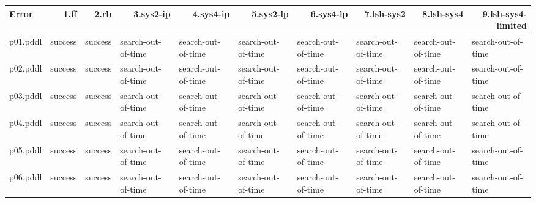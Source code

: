 \documentclass{article}
\begin{document}
\begin{tabular}{@{}lrrrrrrrrr@{}}
Error & 1.ff & 2.rb & 3.sys2-ip & 4.sys4-ip & 5.sys2-lp & 6.sys4-lp & 7.lsh-sys2 & 8.lsh-sys4 & 9.lsh-sys4-limited \\
\midrule
p01.pddl & \multicolumn{1}{|l|}{success} & \multicolumn{1}{|l|}{success} & \multicolumn{1}{|l|}{search-out-of-time} & \multicolumn{1}{|l|}{search-out-of-time} & \multicolumn{1}{|l|}{search-out-of-time} & \multicolumn{1}{|l|}{search-out-of-time} & \multicolumn{1}{|l|}{search-out-of-time} & \multicolumn{1}{|l|}{search-out-of-time} & \multicolumn{1}{|l|}{search-out-of-time} \\
p02.pddl & \multicolumn{1}{|l|}{success} & \multicolumn{1}{|l|}{success} & \multicolumn{1}{|l|}{search-out-of-time} & \multicolumn{1}{|l|}{search-out-of-time} & \multicolumn{1}{|l|}{search-out-of-time} & \multicolumn{1}{|l|}{search-out-of-time} & \multicolumn{1}{|l|}{search-out-of-time} & \multicolumn{1}{|l|}{search-out-of-time} & \multicolumn{1}{|l|}{search-out-of-time} \\
p03.pddl & \multicolumn{1}{|l|}{success} & \multicolumn{1}{|l|}{success} & \multicolumn{1}{|l|}{search-out-of-time} & \multicolumn{1}{|l|}{search-out-of-time} & \multicolumn{1}{|l|}{search-out-of-time} & \multicolumn{1}{|l|}{search-out-of-time} & \multicolumn{1}{|l|}{search-out-of-time} & \multicolumn{1}{|l|}{search-out-of-time} & \multicolumn{1}{|l|}{search-out-of-time} \\
p04.pddl & \multicolumn{1}{|l|}{success} & \multicolumn{1}{|l|}{success} & \multicolumn{1}{|l|}{search-out-of-time} & \multicolumn{1}{|l|}{search-out-of-time} & \multicolumn{1}{|l|}{search-out-of-time} & \multicolumn{1}{|l|}{search-out-of-time} & \multicolumn{1}{|l|}{search-out-of-time} & \multicolumn{1}{|l|}{search-out-of-time} & \multicolumn{1}{|l|}{search-out-of-time} \\
p05.pddl & \multicolumn{1}{|l|}{success} & \multicolumn{1}{|l|}{success} & \multicolumn{1}{|l|}{search-out-of-time} & \multicolumn{1}{|l|}{search-out-of-time} & \multicolumn{1}{|l|}{search-out-of-time} & \multicolumn{1}{|l|}{search-out-of-time} & \multicolumn{1}{|l|}{search-out-of-time} & \multicolumn{1}{|l|}{search-out-of-time} & \multicolumn{1}{|l|}{search-out-of-time} \\
p06.pddl & \multicolumn{1}{|l|}{success} & \multicolumn{1}{|l|}{success} & \multicolumn{1}{|l|}{search-out-of-time} & \multicolumn{1}{|l|}{search-out-of-time} & \multicolumn{1}{|l|}{search-out-of-time} & \multicolumn{1}{|l|}{search-out-of-time} & \multicolumn{1}{|l|}{search-out-of-time} & \multicolumn{1}{|l|}{search-out-of-time} & \multicolumn{1}{|l|}{search-out-of-time} \\

\end{tabular}
\end{document}
